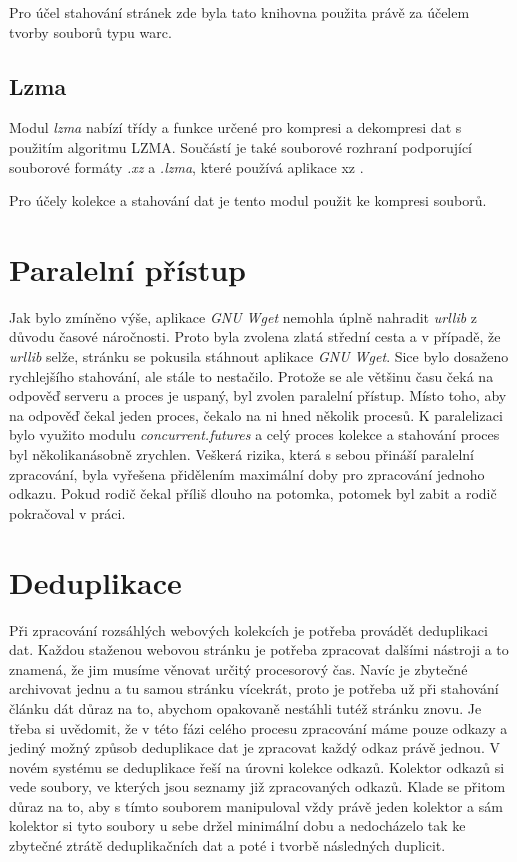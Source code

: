 Pro účel stahování stránek zde byla tato knihovna použita právě za účelem tvorby souborů
typu warc.

\subsection{Lzma}
\label{lzma}
Modul \textit{lzma} nabízí třídy a funkce určené pro kompresi a dekompresi dat s použitím algoritmu LZMA.
Součástí je také souborové rozhraní podporující souborové formáty \textit{.xz} a \textit{.lzma}, které
používá aplikace xz \cite{LZMA}.

Pro účely kolekce a stahování dat je tento modul použit ke kompresi souborů.

\section{Paralelní přístup}
Jak bylo zmíněno výše, aplikace \textit{GNU Wget} nemohla úplně nahradit \textit{urllib} z důvodu časové náročnosti. Proto byla zvolena zlatá střední cesta a v případě,
že \textit{urllib} selže, stránku se pokusila stáhnout aplikace \textit{GNU Wget}. Sice bylo dosaženo rychlejšího stahování, ale stále to nestačilo. Protože se ale většinu
času čeká na odpověď serveru a proces je uspaný, byl zvolen paralelní přístup. Místo toho, aby na odpověď čekal jeden proces, čekalo na ni
hned několik procesů. K paralelizaci bylo využito modulu \textit{concurrent.futures} a celý proces kolekce a stahování proces byl několikanásobně zrychlen. Veškerá rizika,
která s sebou přináší paralelní zpracování, byla vyřešena přidělením maximální doby pro zpracování jednoho odkazu. Pokud rodič čekal příliš
dlouho na potomka, potomek byl zabit a rodič pokračoval v práci.


\section{Deduplikace}
Při zpracování rozsáhlých webových kolekcích je potřeba provádět deduplikaci dat. Každou staženou webovou stránku je potřeba zpracovat
dalšími nástroji a to znamená, že jim musíme věnovat určitý procesorový čas. Navíc je zbytečné archivovat jednu a tu samou stránku
vícekrát, proto je potřeba už při stahování článku dát důraz na to, abychom opakovaně nestáhli tutéž stránku znovu.
Je třeba si uvědomit, že v této fázi celého procesu zpracování máme pouze odkazy a jediný možný způsob deduplikace dat je zpracovat každý
odkaz právě jednou. V novém systému se deduplikace řeší na úrovni kolekce odkazů. Kolektor odkazů si vede soubory, ve kterých jsou seznamy již
zpracovaných odkazů. Klade se přitom důraz na to, aby s tímto souborem manipuloval vždy právě jeden kolektor a sám kolektor si tyto soubory
u sebe držel minimální dobu a nedocházelo tak ke zbytečné ztrátě deduplikačních dat a poté i tvorbě následných duplicit.

